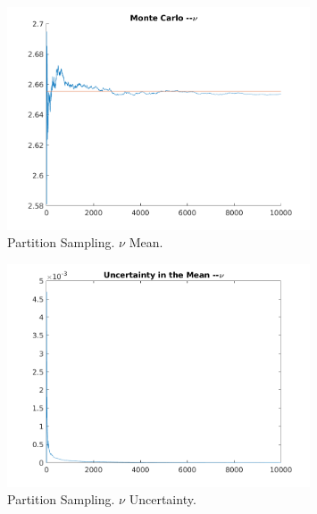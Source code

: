 \documentclass{article}
\begin{document}
\begin{enumerate}
\begin{enumerate}
        \begin{figure}[H]
          \centering
          \includegraphics[width=0.8\textwidth]{partition_nu_mean}
          \caption{Partition Sampling. $\nu$ Mean.}
          \label{fig:partition_nu_mean}
        \end{figure}

        \begin{figure}[H]
          \centering
          \includegraphics[width=0.8\textwidth]{partition_nu_uncertainty}
          \caption{Partition Sampling. $\nu$ Uncertainty.}
          \label{fig:partition_nu_uncertainty}
        \end{figure}
    \end{enumerate}
\end{enumerate}
\end{document}
